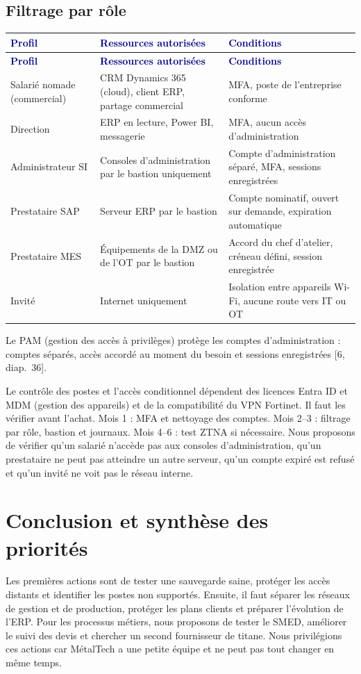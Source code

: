 \documentclass[11pt,a4paper]{article}
\newcommand{\thd}[1]{\textbf{\textcolor{navy}{#1}}}
\begin{document}
\subsection*{Filtrage par rôle}
\begin{xltabular}{\linewidth}{@{}P{30mm}YP{49mm}@{}}\toprule
\thd{Profil} & \thd{Ressources autorisées} & \thd{Conditions}\\\midrule\endfirsthead
\toprule \thd{Profil} & \thd{Ressources autorisées} & \thd{Conditions}\\\midrule\endhead
\bottomrule\endfoot
Salarié nomade (commercial) & CRM Dynamics 365 (cloud), client ERP, partage commercial & MFA, poste de l'entreprise conforme\\
Direction & ERP en lecture, Power BI, messagerie & MFA, aucun accès d'administration\\
Administrateur SI & Consoles d'administration par le bastion uniquement & Compte d'administration séparé, MFA, sessions enregistrées\\
Prestataire SAP & Serveur ERP par le bastion & Compte nominatif, ouvert sur demande, expiration automatique\\
Prestataire MES & Équipements de la DMZ ou de l'OT par le bastion & Accord du chef d'atelier, créneau défini, session enregistrée\\
Invité & Internet uniquement & Isolation entre appareils Wi-Fi, aucune route vers IT ou OT\\
\end{xltabular}
Le PAM (gestion des accès à privilèges) protège les comptes d'administration : comptes séparés, accès accordé au moment du besoin et sessions enregistrées [6, diap.~36].

Le contrôle des postes et l'accès conditionnel dépendent des licences Entra ID et MDM (gestion des appareils) et de la compatibilité du VPN Fortinet. Il faut les vérifier avant l'achat. Mois 1 : MFA et nettoyage des comptes. Mois 2--3 : filtrage par rôle, bastion et journaux. Mois 4--6 : test ZTNA si nécessaire. Nous proposons de vérifier qu'un salarié n'accède pas aux consoles d'administration, qu'un prestataire ne peut pas atteindre un autre serveur, qu'un compte expiré est refusé et qu'un invité ne voit pas le réseau interne.
\section*{Conclusion et synthèse des priorités}
Les premières actions sont de tester une sauvegarde saine, protéger les accès distants et identifier les postes non supportés. Ensuite, il faut séparer les réseaux de gestion et de production, protéger les plans clients et préparer l'évolution de l'ERP. Pour les processus métiers, nous proposons de tester le SMED, améliorer le suivi des devis et chercher un second fournisseur de titane. Nous privilégions ces actions car MétalTech a une petite équipe et ne peut pas tout changer en même temps.
\end{document}
